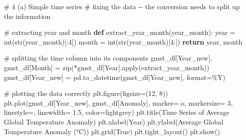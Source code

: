 \documentclass[
  letterpaper,
  DIV=11,
  numbers=noendperiod]{scrartcl}
\newenvironment{Shaded}{\begin{snugshade}}{\end{snugshade}}
\newcommand{\BuiltInTok}[1]{\textcolor[rgb]{0.00,0.23,0.31}{#1}}
\newcommand{\CommentTok}[1]{\textcolor[rgb]{0.37,0.37,0.37}{#1}}
\newcommand{\ControlFlowTok}[1]{\textcolor[rgb]{0.00,0.23,0.31}{\textbf{#1}}}
\newcommand{\DecValTok}[1]{\textcolor[rgb]{0.68,0.00,0.00}{#1}}
\newcommand{\FloatTok}[1]{\textcolor[rgb]{0.68,0.00,0.00}{#1}}
\newcommand{\KeywordTok}[1]{\textcolor[rgb]{0.00,0.23,0.31}{\textbf{#1}}}
\newcommand{\NormalTok}[1]{\textcolor[rgb]{0.00,0.23,0.31}{#1}}
\newcommand{\OperatorTok}[1]{\textcolor[rgb]{0.37,0.37,0.37}{#1}}
\newcommand{\StringTok}[1]{\textcolor[rgb]{0.13,0.47,0.30}{#1}}
\newcommand{\VariableTok}[1]{\textcolor[rgb]{0.07,0.07,0.07}{#1}}
\begin{document}
\begin{Shaded}
\begin{Highlighting}[]
\CommentTok{\# 4 (a) Simple time series}
\CommentTok{\# fixing the data {-}{-} the conversion needs to split up the information}

\CommentTok{\# extracting year and month}
\KeywordTok{def}\NormalTok{ extract\_year\_month(year\_month):}
\NormalTok{    year }\OperatorTok{=} \BuiltInTok{int}\NormalTok{(}\BuiltInTok{str}\NormalTok{(year\_month)[:}\DecValTok{4}\NormalTok{])}
\NormalTok{    month }\OperatorTok{=} \BuiltInTok{int}\NormalTok{(}\BuiltInTok{str}\NormalTok{(year\_month)[}\DecValTok{4}\NormalTok{:])}
    \ControlFlowTok{return}\NormalTok{ year, month}

\CommentTok{\# splitting the time column into its components}
\NormalTok{gmst\_df[}\StringTok{\textquotesingle{}Year\_new\textquotesingle{}}\NormalTok{], gmst\_df[}\StringTok{\textquotesingle{}Month\textquotesingle{}}\NormalTok{] }\OperatorTok{=} \BuiltInTok{zip}\NormalTok{(}\OperatorTok{*}\NormalTok{gmst\_df[}\StringTok{\textquotesingle{}Year\textquotesingle{}}\NormalTok{].}\BuiltInTok{apply}\NormalTok{(extract\_year\_month))}
\NormalTok{gmst\_df[}\StringTok{\textquotesingle{}Year\_new\textquotesingle{}}\NormalTok{] }\OperatorTok{=}\NormalTok{ pd.to\_datetime(gmst\_df[}\StringTok{\textquotesingle{}Year\_new\textquotesingle{}}\NormalTok{], }\BuiltInTok{format}\OperatorTok{=}\StringTok{\textquotesingle{}\%Y\textquotesingle{}}\NormalTok{)}

\CommentTok{\# plotting the data correctly}
\NormalTok{plt.figure(figsize}\OperatorTok{=}\NormalTok{(}\DecValTok{12}\NormalTok{, }\DecValTok{8}\NormalTok{)) }
\NormalTok{plt.plot(gmst\_df[}\StringTok{\textquotesingle{}Year\_new\textquotesingle{}}\NormalTok{], gmst\_df[}\StringTok{\textquotesingle{}Anomaly\textquotesingle{}}\NormalTok{], marker}\OperatorTok{=} \StringTok{\textquotesingle{}o\textquotesingle{}}\NormalTok{, markersize}\OperatorTok{=} \DecValTok{3}\NormalTok{, linestyle}\OperatorTok{=}\StringTok{\textquotesingle{}{-}\textquotesingle{}}\NormalTok{, linewidth}\OperatorTok{=} \FloatTok{1.5}\NormalTok{, color}\OperatorTok{=}\StringTok{\textquotesingle{}lightgrey\textquotesingle{}}\NormalTok{)}
\NormalTok{plt.title(}\StringTok{\textquotesingle{}Time Series of Average Global Temperature Anomaly\textquotesingle{}}\NormalTok{)}
\NormalTok{plt.xlabel(}\StringTok{\textquotesingle{}Year\textquotesingle{}}\NormalTok{)}
\NormalTok{plt.ylabel(}\StringTok{\textquotesingle{}Average Global Temperature Anomaly (°C)\textquotesingle{}}\NormalTok{)}
\NormalTok{plt.grid(}\VariableTok{True}\NormalTok{)}
\NormalTok{plt.tight\_layout()}
\NormalTok{plt.show()}
\end{Highlighting}
\end{Shaded}
\end{document}
